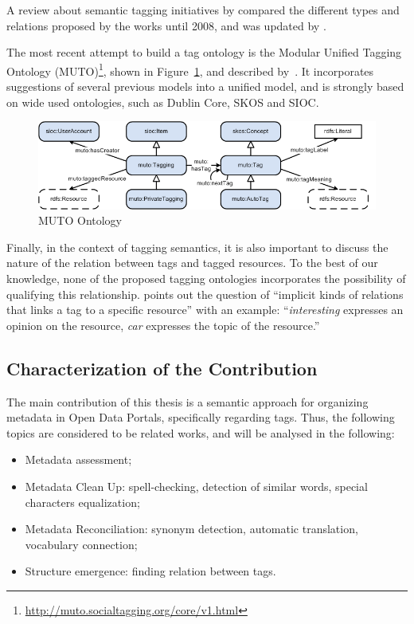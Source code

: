 A review about semantic tagging initiatives by  compared the different types and relations proposed by the works until 2008, and was updated by .

The most recent attempt to build a tag ontology is the Modular Unified Tagging Ontology (MUTO)\footnote{\url{http://muto.socialtagging.org/core/v1.html}}, shown in Figure~\ref{fig:muto}, and described by~.
It incorporates suggestions of several previous models into a unified model, and is strongly based on wide used ontologies, such as Dublin Core, SKOS and SIOC. 

\begin{figure}[tb]
\begin{center}
\includegraphics[width=\columnwidth]{images/muto.png}
\caption{MUTO Ontology}
\label{fig:muto}
\end{center}
\end{figure}

Finally, in the context of tagging semantics, it is also important to discuss the nature of the relation between tags and tagged resources.
To the best of our knowledge, none of the proposed tagging ontologies incorporates the possibility of qualifying this relationship.
 points out the question of ``implicit kinds of relations that links a tag to a specific resource'' with an example: ``\emph{interesting} expresses an opinion on the resource, \emph{car} expresses the topic of the resource.''

\subsection{Characterization of the Contribution}

The main contribution of this thesis is a semantic approach for organizing metadata in Open Data Portals, specifically regarding tags.
Thus, the following topics are considered to be related works, and will be analysed in the following:
\begin{itemize}
	\item Metadata assessment;
	\item Metadata Clean Up: spell-checking, detection of similar words, special characters equalization;
	\item Metadata Reconciliation: synonym detection, automatic translation, vocabulary connection;
	\item Structure emergence: finding relation between tags.
\end{itemize}

